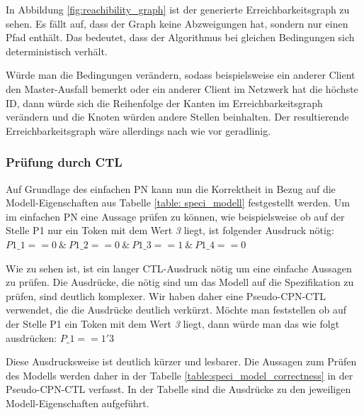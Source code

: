 In Abbildung \ref{fig:reachibility_graph} ist der generierte Erreichbarkeitsgraph zu sehen. Es fällt auf, dass der Graph keine Abzweigungen hat, sondern nur einen Pfad enthält. Das bedeutet, dass der Algorithmus bei gleichen Bedingungen sich deterministisch verhält.

Würde man die Bedingungen verändern, sodass beispielsweise ein anderer Client den Master-Ausfall bemerkt oder ein anderer Client im Netzwerk hat die höchste ID, dann würde sich die Reihenfolge der Kanten im Erreichbarkeitsgraph verändern und die Knoten würden andere Stellen beinhalten. Der resultierende Erreichbarkeitsgraph wäre allerdings nach wie vor geradlinig.

\subsubsection{Prüfung durch CTL}
Auf Grundlage des einfachen PN kann nun die Korrektheit in Bezug auf die Modell-Eigenschaften aus Tabelle \ref{table: speci_modell} festgestellt werden. Um im einfachen PN eine Aussage prüfen zu können, wie beispielsweise ob auf der Stelle P1 nur ein Token mit dem Wert \textit{3} liegt, ist folgender Ausdruck nötig: $P1\_1 == 0\ \&\ P1\_2 == 0\ \&\ P1\_3 == 1\ \&\ P1\_4 == 0$

Wie zu sehen ist, ist ein langer CTL-Ausdruck nötig um eine einfache Aussagen zu prüfen. Die Ausdrücke, die nötig sind um das Modell auf die Spezifikation zu prüfen, sind deutlich komplexer. Wir haben daher eine Pseudo-CPN-CTL verwendet, die die Ausdrücke deutlich verkürzt. Möchte man feststellen ob auf der Stelle P1 ein Token mit dem Wert \textit{3} liegt, dann würde man das wie folgt ausdrücken: $P\_1 == 1'3$

Diese Ausdrucksweise ist deutlich kürzer und lesbarer. Die Aussagen zum Prüfen des Modells werden daher in der Tabelle \ref{table:speci_model_correctness} in der Pseudo-CPN-CTL verfasst. In der Tabelle sind die Ausdrücke zu den jeweiligen Modell-Eigenschaften aufgeführt.

